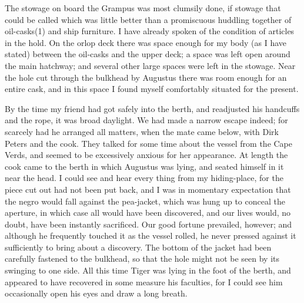 The stowage on board the Grampus was most clumsily done, if stowage that
could be called which was little better than a promiscuous huddling together of
oil-casks(1) and ship furniture. I have already spoken of the condition of
articles in the hold. On the orlop deck there was space enough for my body (as I
have stated) between the oil-casks and the upper deck; a space was left open
around the main hatchway; and several other large spaces were left in the
stowage. Near the hole cut through the bulkhead by Augustus there was room
enough for an entire cask, and in this space I found myself comfortably situated
for the present. 

By the time my friend had got safely into the berth, and readjusted his
handcuffs and the rope, it was broad daylight. We had made a narrow escape
indeed; for scarcely had he arranged all matters, when the mate came below, with
Dirk Peters and the cook. They talked for some time about the vessel from the
Cape Verds, and seemed to be excessively anxious for her appearance. At length
the cook came to the berth in which Augustus was lying, and seated himself in it
near the head. I could see and hear every thing from my hiding-place, for the
piece cut out had not been put back, and I was in momentary expectation that the
negro would fall against the pea-jacket, which was hung up to conceal the
aperture, in which case all would have been discovered, and our lives would, no
doubt, have been instantly sacrificed. Our good fortune prevailed, however; and
although he frequently touched it as the vessel rolled, he never pressed against
it sufficiently to bring about a discovery. The bottom of the jacket had been
carefully fastened to the bulkhead, so that the hole might not be seen by its
swinging to one side. All this time Tiger was lying in the foot of the berth,
and appeared to have recovered in some measure his faculties, for I could see
him occasionally open his eyes and draw a long breath. 

